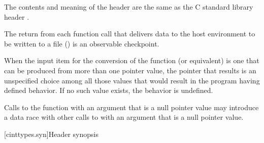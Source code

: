 \pnum
The contents and meaning of the header 
are the same as the C standard library header .

\pnum
The return from each function call
that delivers data
to the host environment
to be written to a file ()
is an observable checkpoint.

\pnum
When the input item for the  conversion
of the  function (or equivalent)
is one that can be produced
from more than one pointer value,
the pointer that results is an unspecified choice among all those values
that would result in the program having defined behavior.
If no such value exists, the behavior is undefined.

\pnum
Calls to the function  with an argument that is a null pointer value may
introduce a data race with other calls to  with
an argument that is a null pointer value.


[cinttypes.syn]{Header  synopsis}

